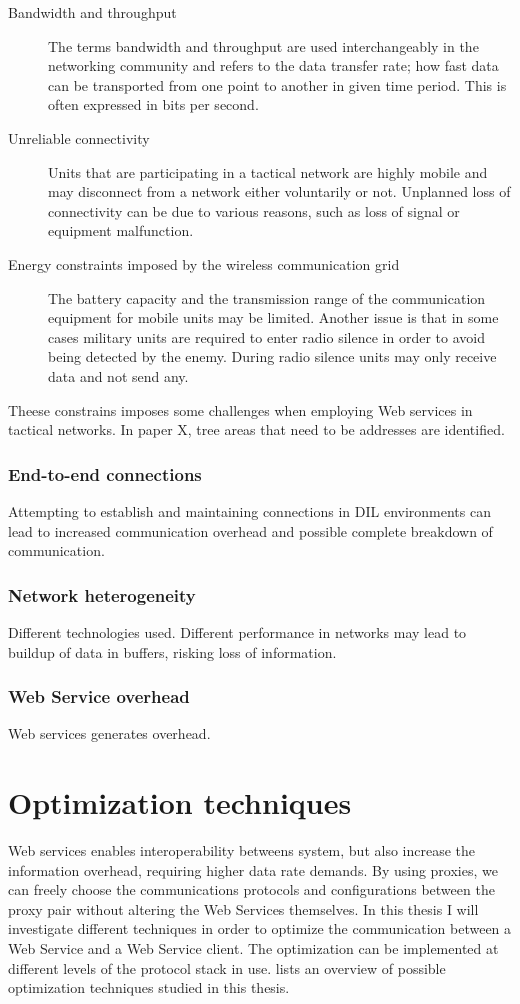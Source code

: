 \documentclass[USenglish]{article}
\begin{document}
\begin{description}
\item[Bandwidth and throughput] The terms bandwidth and throughput are used interchangeably in the networking community and refers to the data transfer rate; how fast data can be transported from one point to another in given time period. This is often expressed in bits per second.
\item[Unreliable connectivity] Units that are participating in a tactical network are highly mobile and may disconnect from a network either voluntarily or not. Unplanned loss of connectivity can be due to various reasons, such as loss of signal or equipment malfunction.
\item[Energy constraints imposed by the wireless communication grid] The battery capacity and the transmission range of the communication equipment for mobile units may be limited. Another issue is that in some cases military units are required to enter radio silence in order to avoid being detected by the enemy. During radio silence units may only receive data and not send any.
\end{description}

Theese constrains imposes some challenges when employing Web services in tactical networks. In paper X, tree areas that need to be addresses are identified\cite{IST-118}.

\label{section:DIL-problems}
\subsubsection{End-to-end connections}
Attempting to establish and maintaining connections in DIL environments can lead to increased communication overhead and possible complete breakdown of communication.
\subsubsection{Network heterogeneity}
Different technologies used. Different performance in networks may lead to buildup of data in buffers, risking loss of information.
\subsubsection{Web Service overhead}
Web services generates overhead.
\section{Optimization techniques}
Web services enables interoperability betweens system, but also increase the information overhead, requiring higher data rate demands. By using proxies, we can freely choose the communications protocols and configurations between the proxy pair without altering the Web Services themselves. In this thesis I will investigate different techniques in order to optimize the communication between a Web Service and a Web Service client. The optimization can be implemented at different levels of the protocol stack in use.  lists an overview of possible optimization techniques studied in this thesis.
\\ \\
\end{document}
